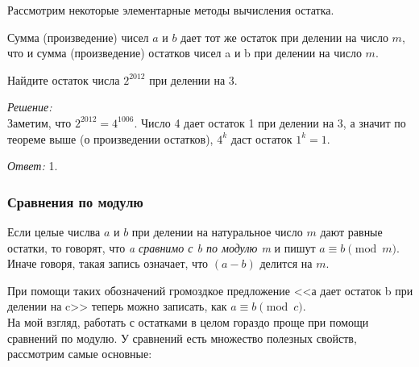 \documentclass[11pt]{article}
\begin{document}
Рассмотрим некоторые элементарные методы вычисления остатка.

\begin{theorem}

	Сумма (произведение) чисел $a$ и $b$ дает тот же остаток при делении на число  $m$, что и сумма (произведение) остатков чисел a и b при делении на число $m$.

\end{theorem}

\begin{example}
	Найдите остаток числа $2^{2012}$ при делении на 3.
\end{example}
\textit{Решение:}\\
Заметим, что $2^{2012} = 4^{1006}$. Число 4  дает остаток 1 при делении на 3, а значит по теореме выше (о произведении остатков), $4^k$ даст остаток $1^k = 1$.

\textit{Ответ:} 1.

\subsubsection{Сравнения по модулю}
\begin{definition}
	Если целые числва $a$ и $b$ при делении на натуральное число $m$ дают равные остатки, то говорят, что \emph{a сравнимо с b по модулю m} и пишут $a \equiv b \pmod m$.
Иначе говоря, такая запись означает, что $(a - b)$ делится на $m$.
\end{definition}

При помощи таких обозначений громоздкое предложение <<а дает остаток b при делении на c>> теперь можно записать, как $a \equiv b \pmod c$.\\

На мой взгляд, работать с остатками в целом гораздо проще при помощи сравнений по модулю. У сравнений есть множество полезных свойств, рассмотрим самые основные:\\
\end{document}
